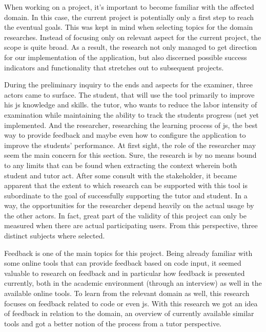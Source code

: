 When working on a project, it's important to become familiar with the affected
domain. In this case, the current project is potentially only a first step to
reach the eventual goals. This was kept in mind when selecting topics for the
domain researches. Instead of focusing only on relevant aspect for the current
project, the scope is quite broad. As a result, the research 
not only managed to get direction for our implementation of the application, 
but also discerned possible success indicators and functionality that stretches 
out to subsequent projects.

During the preliminary inquiry to the ends and aspects for the \gls{examiner},
three actors came to surface. The student, that will use the tool primarily to
improve his \gls{js} knowledge and skills. the tutor, who wants to reduce the
labor intensity of examination while maintaining the ability to track the
students progress (net yet implemented.
And the researcher, researching the learning process of \gls{js},
the best way to provide \gls{feedback}
and maybe even how to configure the application to improve the students'
performance. At first sight, the role of the researcher may seem the main
concern for this section. Sure, the research is by no means bound to any
limits that can be found when extracting the context wherein both student and tutor
act. After some consult with the stakeholder, it became apparent that the
extent to which research can be supported with this tool is subordinate to the
goal of successfully supporting the tutor and student. In a way, the opportunities
for the researcher depend heavily on the actual usage by the other actors.
In fact, great part of the validity of this project can only be measured when 
there are actual participating users. From this perspective, three distinct 
subjects where selected. 

Feedback is one of the main topics for this project. Being already familiar with 
some online tools that can provide \gls{feedback} based on code input, it seemed 
valuable to research on feedback and in particular how \gls{feedback} is 
presented currently, both in the academic environment (through an interview) as 
well in the available online tools. To learn from the relevant domain as well, 
this research focuses on \gls{feedback} related to \gls{code} or even \gls{js}. 
With this research we got an idea of feedback in relation to the domain, an 
overview of currently available similar tools and got a better notion of the 
process from a tutor perspective.

